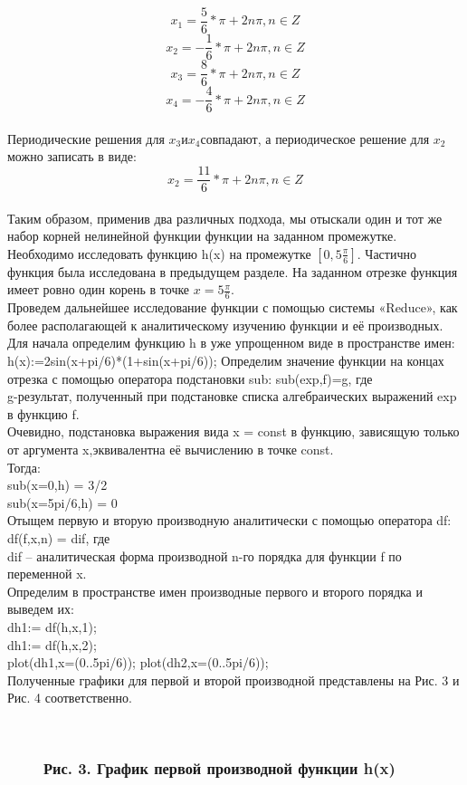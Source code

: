 \documentclass[russian,utf8,nocolumnxxxi,nocolumnxxxii]{eskdtext}
\begin{document}
$$x_1=\frac{5}{6}*\pi+2n\pi,n\in Z$$
$$x_2=-\frac{1}{6}*\pi+2n\pi,n\in Z$$
$$x_3=\frac{8}{6}*\pi+2n\pi,n\in Z$$
$$x_4=-\frac{4}{6}*\pi+2n\pi,n\in Z$$\\
Периодические решения для $x_3$и$x_4$совпадают, а периодическое решение для $x_2$ можно записать в виде:
$$x_2=\frac{11}{6}*\pi+2n\pi,n\in Z$$\\
Таким образом, применив два различных подхода, мы отыскали один и тот же набор корней нелинейной функции
\newpage
{ функции на заданном промежутке.}\\
Необходимо исследовать функцию h(x)  на промежутке $[0,5\frac{\pi}{6}]$.
Частично функция была исследована в предыдущем разделе. На заданном отрезке функция имеет ровно один корень в точке $x=5\frac{\pi}{6}$.\\
Проведем дальнейшее исследование функции с помощью системы «Reduce», как более располагающей к аналитическому изучению функции и её производных. Для начала определим функцию h в уже упрощенном виде в пространстве имен:\\
h(x):=2sin(x+pi/6)*(1+sin(x+pi/6));
Определим значение функции на концах отрезка с помощью оператора подстановки sub:
sub(exp,f)=g, где\\
g-результат, полученный при подстановке списка алгебраических выражений exp в функцию f.\\
Очевидно, подстановка выражения вида x = const в функцию, зависящую только от аргумента x,эквивалентна её вычислению в точке const.\\
Тогда:\\
sub(x=0,h) = 3/2\\
sub(x=5pi/6,h) = 0\\
Отыщем первую и вторую производную аналитически с помощью оператора df:\\
df(f,x,n) = dif, где\\
dif – аналитическая форма производной n-го порядка для функции f по переменной x.\\
Определим в пространстве имен производные первого и второго порядка и выведем их:\\
dh1:= df(h,x,1);\\
dh1:= df(h,x,2);\\
plot(dh1,x=(0..5pi/6));
\newpage
plot(dh2,x=(0..5pi/6));\\
Полученные графики для первой и второй производной представлены на Рис. 3 и Рис. 4 соответственно.
\begin{figure}[H]
\begin{center}
\begin{minipage}[h]{0.70\linewidth}
  \\
\frametitle{Рис. 3. График первой производной функции h(x)}
\frametitle{}
\end{minipage}
\end{center}
\end{figure}
\end{document}
